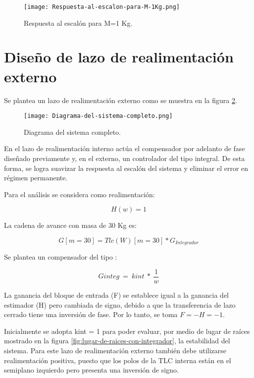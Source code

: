 \begin{figure}[H]
	\centering
	\texttt{[image: Respuesta-al-escalon-para-M-1Kg.png]}
	\caption{Respuesta al escalón para M=1 Kg.}
	\label{fig:respuesta-al-escalon-para-M-1Kg}
\end{figure}

\section{Diseño de lazo de realimentación externo}

\noindent Se plantea un lazo de realimentaci\'{o}n externo como se muestra en la  figura \ref{fig:diagrama-del-sistema-completo}.

\begin{figure}[H]
	\centering
	\texttt{[image: Diagrama-del-sistema-completo.png]}
	\caption{Diagrama del sistema completo.}
	\label{fig:diagrama-del-sistema-completo}
\end{figure}


\noindent En el lazo de realimentaci\'{o}n interno act\'{u}a el compensador por adelanto de fase dise\~{n}ado previamente y, en el externo, un controlador del tipo integral. De esta forma, se logra suavizar la respuesta al escal\'{o}n del sistema y eliminar el error en r\'{e}gimen permanente.


\noindent Para el an\'{a}lisis se considera como realimentaci\'{o}n: 

\[H(w)=1\] 

\noindent La cadena de avance con masa de 30 Kg es:

\[G[m=30]=Tlc(W)[m=30]*G_{Integrador}\] 

\noindent Se  plantea un compensador del tipo :

\[Ginteg\ =\ kint\ *\ \frac{1}{w}\] 

\noindent La ganancia del bloque de entrada (F) se establece igual a la ganancia del estimador (H) pero cambiada de signo, debido a que la transferencia de lazo cerrado tiene una inversi\'{o}n de fase. Por lo tanto, se toma $F=-H=-1$.

\noindent Inicialmente se adopta kint = 1 para poder evaluar, por medio de lugar de ra\'{i}ces mostrado en la figura \ref{fig:lugar-de-raices-con-integrador}, la estabilidad del sistema. Para este lazo de realimentaci\'{o}n externo tambi\'{e}n debe utilizarse realimentaci\'{o}n positiva, puesto que los polos de la TLC interna est\'{a}n en el semiplano izquierdo pero presenta una inversi\'{o}n de signo.



